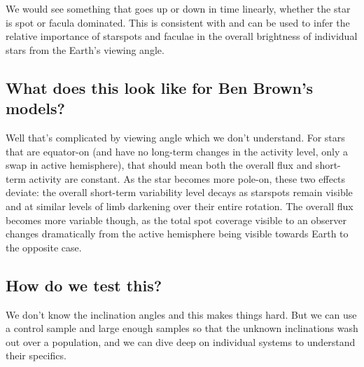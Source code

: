 \documentclass[twocolumn,dvipsnames]{aastex631}
\begin{document}
We would see something that goes up or down in time linearly, whether the star is spot or facula dominated. This is consistent with \citet{Montet17} and can be used to infer the relative importance of starspots and faculae in the overall brightness of individual stars from the Earth's viewing angle.

\subsection{What does this look like for Ben Brown's models?}

Well that's complicated by viewing angle which we don't understand. For stars that are equator-on (and have no long-term changes in the activity level, only a swap in active hemisphere), that should mean both the overall flux and short-term activity are constant. As the star becomes more pole-on, these two effects deviate: the overall short-term variability level decays as starspots remain visible and at similar levels of limb darkening over their entire rotation. The overall flux becomes more variable though, as the total spot coverage visible to an observer changes dramatically from the active hemisphere being visible towards Earth to the opposite case. 

\subsection{How do we test this?}

We don't know the inclination angles and this makes things hard. But we can use a control sample and large enough samples so that the unknown inclinations wash out over a population, and we can dive deep on individual systems to understand their specifics. 


{}

\end{document}
